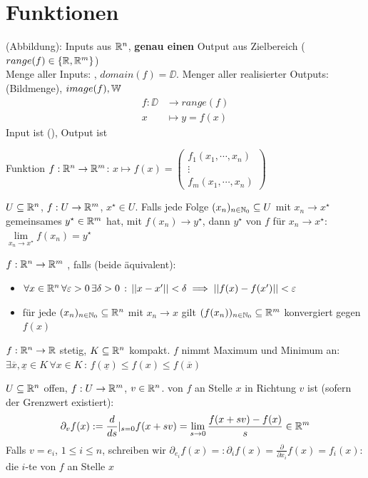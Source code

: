 \section{Funktionen}

\begin{samepage}
\Def {} (Abbildung): Inputs aus $\mathbb{R}^n$,
\textbf{genau einen} Output aus Zielbereich ($range(f) \in \{\mathbb{R}, \mathbb{R}^m \}$) \\
Menge aller Inputs: , $domain(f) = \DD$.
Menger aller realisierter Outputs:  (Bildmenge), $image(f), \mathbb{W}$
\begin{align*}
    f: \DD &\to range(f) \\
         x &\mapsto y = f(x)
\end{align*}
Input ist  (), Output ist 

Funktion $f: \mathbb{R}^n \to \mathbb{R}^m$: $x \mapsto f(x) = \begin{pmatrix}
    f_1(x_1, \cdots, x_n) \\
    \vdots \\
    f_m(x_1, \cdots, x_n)
\end{pmatrix}$
\end{samepage}

\Def $U \subseteq \mathbb{R}^n$, $f: U \to \mathbb{R}^m$, $x^\star \in U$.
Falls jede Folge $(x_n)_{n \in \mathbb{N}_0} \subseteq U$ mit $x_n \to x^\star$
gemeinsames $y^\star \in \mathbb{R}^m$ hat, mit $f(x_n) \to y^\star$,
dann $y^\star$  von $f$ für $x_n \to x^\star$: $\lim\limits_{x_n \to x^\star} f(x_n) = y^\star$

\Def $f: \mathbb{R}^n \to \mathbb{R}^m$ , falls (beide äquivalent):
\begin{itemize}
    \item $\forall x \in \mathbb{R}^n \, \forall \varepsilon > 0 \, \exists \delta > 0 \, : \, ||x - x'|| < \delta \implies ||f(x) - f(x')|| < \varepsilon$
    \item für jede $(x_n)_{n\in\mathbb{N}_0} \subseteq \mathbb{R}^n$ mit $x_n \to x$ gilt $(f(x_n))_{n\in\mathbb{N}_0} \subseteq \mathbb{R}^m$ konvergiert gegen $f(x)$
\end{itemize}

\Satz $f: \mathbb{R}^n \to \mathbb{R}$ stetig, $K \subseteq \mathbb{R}^n$ kompakt. $f$ nimmt Maximum und Minimum an:
$\exists \overline{x}, \underline{x} \in K \, \forall x \in K \, : \, f(\underline{x}) \le f(x) \le f(\overline{x})$

\Def $U \subseteq \mathbb{R}^n$ offen, $f: U \to \mathbb{R}^m$, $v \in \mathbb{R}^n$.  von $f$ an Stelle $x$ in Richtung $v$ ist (sofern der Grenzwert existiert):
$$\partial_v f(x) := \frac{d}{ds} \lvert_{s=0} f(x + sv) = \lim_{s \to 0} \frac{f(x + sv) - f(x)}{s} \in \mathbb{R}^m$$
Falls $v = e_i$, $1 \le i \le n$, schreiben wir $\partial_{e_i} f(x) =: \partial_i f(x) = \frac{\partial}{\partial x_i}f(x) = f_i(x)$:
die $i$-te  von $f$ an Stelle $x$


